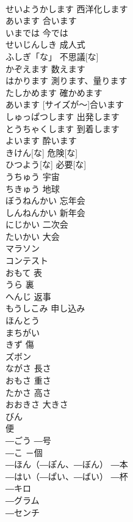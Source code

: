 \documentclass[8pt]{extreport}
\begin{document}
\begin{CJK}{UTF8}{min}
\\	せいようかします	西洋化します	
\\	あいます	合います	
\\	いまでは	今では	
\\	せいじんしき	成人式	
\\	ふしぎ「な」	不思議[な]	
\\	かぞえます	数えます	
\\	はかります	測ります、量ります	
\\	たしかめます	確かめます	
\\	[サイズが～]あいます	[サイズが～]合います	
\\	しゅっぱつします	出発します	
\\	とうちゃくします	到着します	
\\	よいます	酔います	
\\	きけん[な]	危険[な]	
\\	ひつよう[な]	必要[な]	
\\	うちゅう	宇宙	
\\	ちきゅう	地球	
\\	ぼうねんかい	忘年会	
\\	しんねんかい	新年会	
\\	にじかい	二次会	
\\	たいかい	大会	
\\	マラソン			
\\	コンテスト			
\\	おもて	表	
\\	うら	裏	
\\	へんじ	返事	
\\	もうしこみ	申し込み	
\\	ほんとう			
\\	まちがい			
\\	きず	傷	
\\	ズボン			
\\	ながさ	長さ	
\\	おもさ	重さ	
\\	たかさ	高さ	
\\	おおきさ	大きさ	
\\	びん	
\\	便	
\\	―ごう	―号	
\\	―こ	－個	
\\	―ほん（―ぽん、―ぼん）	―本	
\\	―はい（―ぱい、―ばい）	―杯	
\\	―キロ			
\\	―グラム			
\\	―センチ			

\end{CJK}
\end{document}

